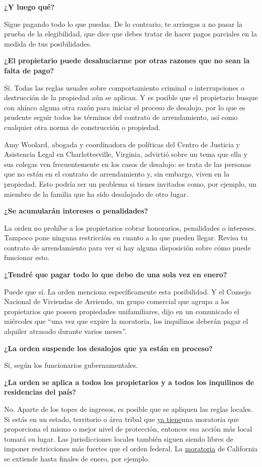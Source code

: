 \textbf{¿Y luego qué?}

Sigue pagando todo lo que puedas. De lo contrario, te arriesgas a no
pasar la prueba de la elegibilidad, que dice que debes tratar de hacer
pagos parciales en la medida de tus posibilidades.

\textbf{¿El propietario puede desahuciarme por otras razones que no sean
la falta de pago?}

Sí. Todas las reglas usuales sobre comportamiento criminal o
interrupciones o destrucción de la propiedad aún se aplican. Y es
posible que el propietario busque con ahínco alguna otra razón para
iniciar el proceso de desalojo, por lo que es prudente seguir todos los
términos del contrato de arrendamiento, así como cualquier otra norma de
construcción o propiedad.

Amy Woolard, abogada y coordinadora de políticas del Centro de Justicia
y Asistencia Legal en Charlottesville, Virginia, advirtió sobre un tema
que ella y sus colegas ven frecuentemente en los casos de desalojo: se
trata de las personas que no están en el contrato de arrendamiento y,
sin embargo, viven en la propiedad. Esto podría ser un problema si
tienes invitados como, por ejemplo, un miembro de la familia que ha sido
desalojado de otro lugar.

\textbf{¿Se acumularán intereses o penalidades?}

La orden no prohíbe a los propietarios cobrar honorarios, penalidades o
intereses. Tampoco pone ninguna restricción en cuanto a lo que pueden
llegar. Revisa tu contrato de arrendamiento para ver si hay alguna
disposición sobre cómo puede funcionar esto.

\textbf{¿Tendré que pagar todo lo que debo de una sola vez en enero?}

Puede que sí. La orden menciona específicamente esta posibilidad. Y el
Consejo Nacional de Viviendas de Arriendo, un grupo comercial que agrupa
a los propietarios que poseen propiedades unifamiliares, dijo en un
comunicado el miércoles que ``una vez que expire la moratoria, los
inquilinos deberán pagar el alquiler atrasado durante varios meses''.

\textbf{¿La orden suspende los desalojos que ya están en proceso?}

Sí, según los funcionarios gubernamentales.

\textbf{¿La orden se aplica a todos los propietarios y a todos los
inquilinos de residencias del país?}

No. Aparte de los topes de ingresos, es posible que se apliquen las
reglas locales. Si estás en un estado, territorio o área tribal que
\href{https://evictionlab.org/covid-eviction-policies/}{ya tiene}una
moratoria que proporciona el mismo o mejor nivel de protección, entonces
esa acción más local tomará su lugar. Las jurisdicciones locales también
siguen siendo libres de imponer restricciones más fuertes que el orden
federal. La
\href{https://www.gov.ca.gov/2020/08/31/governor-newsom-signs-statewide-covid-19-tenant-and-landlord-protection-legislation/}{moratoria}
de California se extiende hasta finales de enero, por ejemplo.


